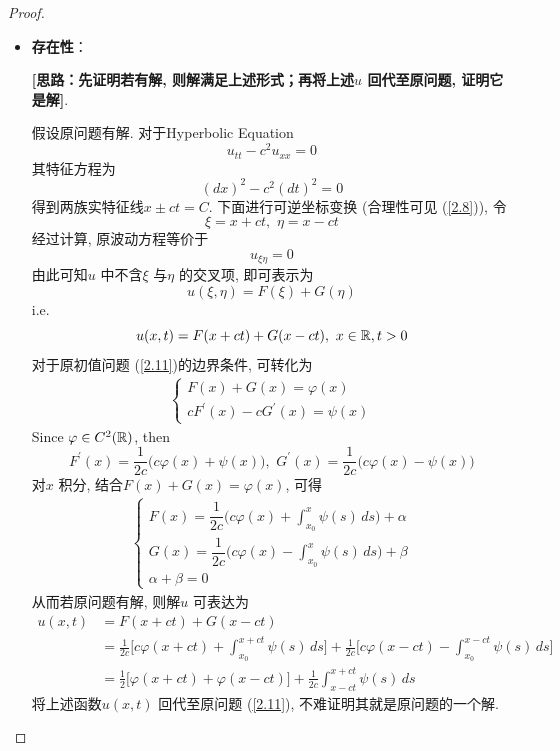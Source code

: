 \begin{thm}
		\begin{proof}
			\begin{itemize}
				\item \textbf{存在性}：
				\begin{center}
					\textbf{[思路：先证明若有解, 则解满足上述形式；再将上述$u$ 回代至原问题, 证明它是解]}. 
				\end{center}
				\newpage
				假设原问题有解. 对于Hyperbolic Equation
				\[ u_{tt} - c^2 u_{xx} = 0 \]
				其特征方程为
				\[ (dx)^2 - c^2(dt)^2 = 0 \]
				得到两族实特征线$x \pm ct = C$. 下面进行可逆坐标变换 (合理性可见 (\ref{2.8})), 令
				\[ \xi = x + ct , \,\, \eta = x - ct \]
				经过计算, 原波动方程等价于
				\[ u_{\xi \eta} = 0 \]
				由此可知$u$ 中不含$\xi$ 与$\eta$ 的交叉项, 即可表示为
				\[ u(\xi , \eta) = F(\xi) + G(\eta) \]
				i.e. 
				\[ u(x , t) = F(x + ct) + G(x - ct) , \,\, x \in \mathbb{R} , t > 0 \]
				对于原初值问题 (\ref{2.11})的边界条件, 可转化为
				\begin{align*}
					\begin{cases}
						F(x) + G(x) = \varphi(x) \\
						cF^{'}(x) - c G^{'}(x) = \psi(x)
					\end{cases}
				\end{align*}
				Since $\varphi \in C^{2}(\mathbb{R})$, then 
				\[ F^{'}(x) = \frac{1}{2c} \Big( c \varphi(x) + \psi(x) \Big) , \,\, G^{'}(x) = \frac{1}{2c} \Big( c \varphi(x) - \psi(x) \Big) \]
				对$x$ 积分, 结合$F(x) + G(x) = \varphi(x)$, 可得
				\begin{align*}
					\begin{cases}
						F(x) = \dfrac{1}{2c} \Big( c \varphi(x) + \int_{x_0}^x \psi(s) \, ds \Big) + \alpha \\
						G(x) = \dfrac{1}{2c} \Big( c \varphi(x) - \int_{x_0}^x \psi(s) \, ds \Big) + \beta \\
						\alpha + \beta = 0
					\end{cases}
				\end{align*}
				从而若原问题有解, 则解$u$ 可表达为
				\begin{align*}
					u(x , t) 
					&= F(x + ct) + G(x - ct) \\
					&= \frac{1}{2c} \Big[ c \varphi(x + ct) + \int_{x_0}^{x + ct} \psi(s) \, ds \Big] + \frac{1}{2c} \Big[ c \varphi(x - ct) - \int_{x_0}^{x - ct} \psi(s) \, ds \Big] \\
					&= \frac{1}{2} \Big[ \varphi(x + ct) + \varphi(x - ct) \Big] + \frac{1}{2c} \int_{x - ct}^{x + ct} \psi(s) \, ds
				\end{align*}
				将上述函数$u(x , t)$ 回代至原问题 (\ref{2.11}), 不难证明其就是原问题的一个解. 
				

\end{itemize}
\end{proof}
\end{thm}
